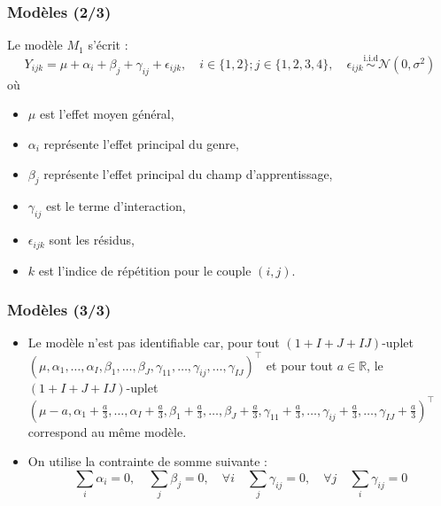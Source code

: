 \documentclass{beamer}
\begin{document}
		
		\begin{frame}
			\frametitle{Modèles (2/3)} 
			Le modèle $M_1$ s'écrit :
			\begin{equation*}
				Y_{ijk} = \mu + \alpha_i + \beta_j + \gamma_{ij} + \epsilon_{ijk}, \quad i \in \{1,2\}; j \in \{1,2,3,4\},\quad \epsilon_{ijk} \overset{\text{i.i.d}}{\sim} \mathcal{N}(0, \sigma^2)
			\end{equation*}
			où
			\begin{itemize}
				\item $\mu$ est l'effet moyen général,
				\vfill
				\item $\alpha_i$ représente l'effet principal du genre,
				\vfill
				\item $\beta_j$ représente l'effet principal du champ d'apprentissage,
				\vfill
				\item $\gamma_{ij}$ est le terme d'interaction,
				\vfill
				\item $\epsilon_{ijk}$ sont les résidus,
				\vfill
				\item $k$ est l'indice de répétition pour le couple $(i,j)$.
			\end{itemize}
		\end{frame}
		
	\begin{frame}
		\frametitle{Modèles (3/3)} 
		\begin{itemize}
			\item Le modèle n'est pas identifiable car, pour tout $(1+I+J+IJ)$-uplet $(\mu, \alpha_1, \ldots, \alpha_I, \beta_1, \ldots, \beta_J, \gamma_{11}, \ldots, \gamma_{ij}, \ldots, \gamma_{IJ})^\top$ et pour tout $a \in \mathbb{R}$, le $(1+I+J+IJ)$-uplet $(\mu-a, \alpha_1+\frac{a}{3}, \ldots, \alpha_I+\frac{a}{3}, \beta_1+\frac{a}{3}, \ldots, \beta_J+\frac{a}{3}, \gamma_{11}+\frac{a}{3}, \ldots, \gamma_{ij}+\frac{a}{3}, \ldots, \gamma_{IJ}+\frac{a}{3})^\top$ correspond au même modèle.
			\vfill
			\item On utilise la contrainte de somme suivante :
			\begin{equation*}
				\sum_{i} \alpha_i = 0, \quad \sum_{j} \beta_j = 0, \quad \forall i \quad \sum_{j} \gamma_{ij} = 0, \quad \forall j \quad \sum_{i} \gamma_{ij} = 0
			\end{equation*}
		\end{itemize}
	\end{frame}
	
		
		
\end{document}
